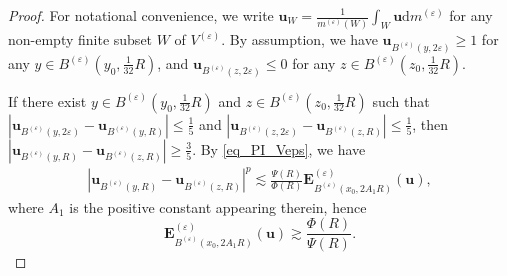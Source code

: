 \documentclass[11pt,a4paper]{article}
\numberwithin{equation}{section}
\theoremstyle{plain}
\theoremstyle{definition}
\begin{document}
\begin{proof}
For notational convenience, we write $\mathbf{u}_{W}=\frac{1}{m^{(\varepsilon)}(W)}\int_{W}\mathbf{u}\mathrm{d} m^{(\varepsilon)}$ for any non-empty finite subset $W$ of $V^{(\varepsilon)}$. By assumption, we have $\mathbf{u}_{B^{(\varepsilon)}(y,2\varepsilon)}\ge1$ for any $y\in B^{(\varepsilon)}(y_0,\frac{1}{32}R)$, and $\mathbf{u}_{B^{(\varepsilon)}(z,2\varepsilon)}\le0$ for any $z\in B^{(\varepsilon)}(z_0,\frac{1}{32}R)$.

If there exist $y\in B^{(\varepsilon)}(y_0,\frac{1}{32}R)$ and $z\in B^{(\varepsilon)}(z_0,\frac{1}{32}R)$ such that $|\mathbf{u}_{B^{(\varepsilon)}(y,2\varepsilon)}-\mathbf{u}_{B^{(\varepsilon)}(y,R)}|\le \frac{1}{5}$ and $|\mathbf{u}_{B^{(\varepsilon)}(z,2\varepsilon)}-\mathbf{u}_{B^{(\varepsilon)}(z,R)}|\le \frac{1}{5}$, then $|\mathbf{u}_{B^{(\varepsilon)}(y,R)}-\mathbf{u}_{B^{(\varepsilon)}(z,R)}|\ge \frac{3}{5}$. By \ref{eq_PI_Veps}, we have
\begin{align*}
|\mathbf{u}_{B^{(\varepsilon)}(y,R)}-\mathbf{u}_{B^{(\varepsilon)}(z,R)}|^p\lesssim \frac{\Psi(R)}{\Phi(R)}\mathbf{E}^{(\varepsilon)}_{B^{(\varepsilon)}(x_0,2A_1R)}(\mathbf{u}),
\end{align*}
where $A_1$ is the positive constant appearing therein, hence
$$\mathbf{E}^{(\varepsilon)}_{B^{(\varepsilon)}(x_0,2A_1R)}(\mathbf{u})\gtrsim \frac{\Phi(R)}{\Psi(R)}.$$


\end{proof}
\end{document}
